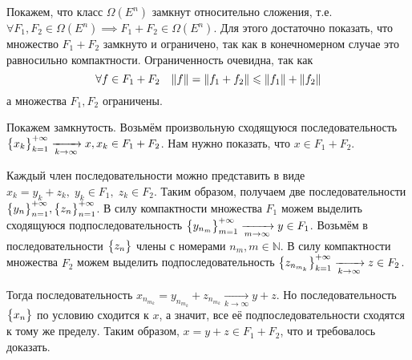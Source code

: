Покажем, что класс $\Omega(E^{n})$ замкнут относительно сложения, т.е. $\forall F_{1}, F_{2} \in \Omega(E^{n}) \implies F_{1} + F_{2} \in \Omega(E^{n})$.
Для этого достаточно показать, что множество $F_{1} + F_{2}$ замкнуто и ограничено, так как в конечномерном случае это равносильно компактности.
Ограниченность очевидна, так как 
\begin{equation*}
    \forall f \in F_{1} + F_{2} \quad \lVert f \rVert = \lVert f_1 + f_2 \rVert \leqslant \lVert f_1 \rVert + \lVert f_2 \rVert
\end{equation*}
а множества $F_{1}, F_{2}$ ограничены.

Покажем замкнутость.
Возьмём произвольную сходящуюся последовательность $\bigl\{ x_k \bigr\}_{k = 1}^{+\infty} \xrightarrow[k \to \infty]{} x, x_k \in F_{1} + F_{2}$.
Нам нужно показать, что $x \in F_{1} + F_{2}$.

Каждый член последовательности можно представить в виде $x_k = y_k + z_k, \; y_k \in F_{1}, \; z_k \in F_{2}$.
Таким образом, получаем две последовательности $\bigl\{ y_n \bigr\}_{n=1}^{+\infty}, \bigl\{ z_n \bigr\}_{n = 1}^{+\infty}$.
В силу компактности множества $F_{1}$ можем выделить сходящуюся подпоследовательность $\bigl\{ y_{n_m} \bigr\}_{m=1}^{+\infty} \xrightarrow[m \to \infty]{} y \in F_{1}$.
Возьмём в последовательности $\bigl\{ z_n \bigr\}$ члены с номерами $n_m, m \in \mathbb{N}$.
В силу компактности множества $F_{2}$ можем выделить подпоследовательность $\bigl\{ z_{n_{m_k}} \bigr\}_{k=1}^{+\infty} \xrightarrow[k \to \infty]{} z \in F_{2}$.

Тогда последовательность $x_{n_{m_k}} = y_{n_{m_k}} + z_{n_{m_k}} \xrightarrow[k \to \infty]{} y + z$.
Но последовательность $\bigl\{ x_n \bigr\}$ по условию сходится к $x$, а значит, все её подпоследовательности сходятся к тому же пределу.
Таким образом, $x = y + z \in F_{1} + F_{2}$, что и требовалось доказать.